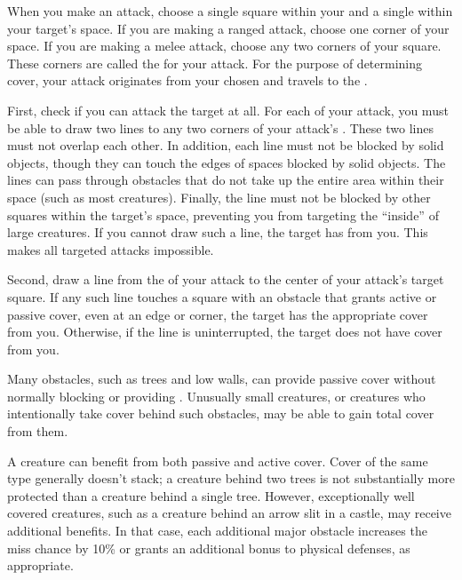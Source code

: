 
            When you make an attack, choose a single square within your  and a single  within your target's space.
            If you are making a ranged attack, choose one corner of your space.
            If you are making a melee attack, choose any two corners of your square.
            These corners are called the  for your attack.
            For the purpose of determining cover, your attack originates from your chosen  and travels to the .

            First, check if you can attack the target at all.
            For each  of your attack, you must be able to draw two lines to any two corners of your attack's .
            These two lines must not overlap each other.
            In addition, each line must not be blocked by solid objects, though they can touch the edges of spaces blocked by solid objects.
            The lines can pass through obstacles that do not take up the entire area within their space (such as most creatures).
            Finally, the line must not be blocked by other squares within the target's space, preventing you from targeting the ``inside'' of large creatures.
            If you cannot draw such a line, the target has  from you.
            This makes all targeted attacks impossible.

            Second, draw a line from the  of your attack to the center of your attack's target square.
            If any such line touches a square with an obstacle that grants active or passive cover, even at an edge or corner, the target has the appropriate cover from you.
            Otherwise, if the line is uninterrupted, the target does not have cover from you.

             Many obstacles, such as trees and low walls, can provide passive cover without normally blocking  or providing .
            Unusually small creatures, or creatures who intentionally take cover behind such obstacles, may be able to gain total cover from them.

            A creature can benefit from both passive and active cover.
            Cover of the same type generally doesn't stack; a creature behind two trees is not substantially more protected than a creature behind a single tree.
            However, exceptionally well covered creatures, such as a creature behind an arrow slit in a castle, may receive additional benefits.
            In that case, each additional major obstacle increases the miss chance by 10\% or grants an additional  bonus to physical defenses, as appropriate.


